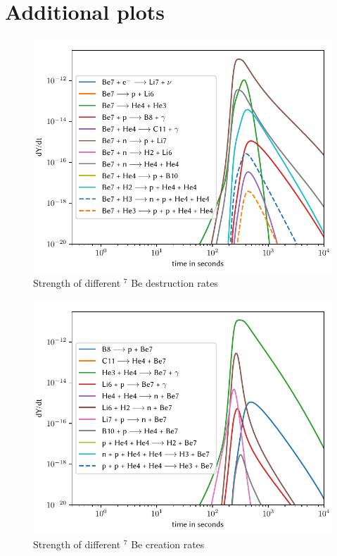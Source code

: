 \chapter{Additional plots}
\label{chap:more_plots}

\begin{figure}[ht]
    \includegraphics[width=5.1in]{figures/app/Be7destruct.pdf}
    \caption{Strength of different ${}^7$ Be destruction rates}
    \label{fig:Be7destruct}
\end{figure}

\begin{figure}[ht]
    \includegraphics[width=5.1in]{figures/app/Be7create.pdf}
    \caption{Strength of different ${}^7$ Be creation rates}
    \label{fig:Be7create}
\end{figure}

